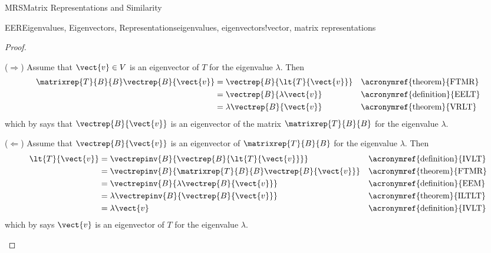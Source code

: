 \begin{subsect}{MRS}{Matrix Representations and Similarity}
\begin{theorem}{EER}{Eigenvalues, Eigenvectors, Representations}{eigenvalues, eigenvectors!vector, matrix representations}
\end{theorem}
%
\begin{proof}
\begin{para}($\Rightarrow$) Assume that $\vect{v}\in V$ is an eigenvector of $T$ for the eigenvalue $\lambda$.  Then
%
\begin{align*}
\matrixrep{T}{B}{B}\vectrep{B}{\vect{v}}
&=\vectrep{B}{\lt{T}{\vect{v}}}&&\text{\acronymref{theorem}{FTMR}}\\
&=\vectrep{B}{\lambda\vect{v}}&&\text{\acronymref{definition}{EELT}}\\
&=\lambda\vectrep{B}{\vect{v}}&&\text{\acronymref{theorem}{VRLT}}
\end{align*}
%
which by  says that $\vectrep{B}{\vect{v}}$ is an eigenvector of the matrix $\matrixrep{T}{B}{B}$ for the eigenvalue $\lambda$.\end{para}
%
\begin{para}($\Leftarrow$)  Assume that $\vectrep{B}{\vect{v}}$ is an eigenvector of $\matrixrep{T}{B}{B}$ for the eigenvalue $\lambda$.  Then
%
\begin{align*}
\lt{T}{\vect{v}}
&=\vectrepinv{B}{\vectrep{B}{\lt{T}{\vect{v}}}}&&\text{\acronymref{definition}{IVLT}}\\
&=\vectrepinv{B}{\matrixrep{T}{B}{B}\vectrep{B}{\vect{v}}}&&\text{\acronymref{theorem}{FTMR}}\\
&=\vectrepinv{B}{\lambda\vectrep{B}{\vect{v}}}&&\text{\acronymref{definition}{EEM}}\\
&=\lambda\vectrepinv{B}{\vectrep{B}{\vect{v}}}&&\text{\acronymref{theorem}{ILTLT}}\\
&=\lambda\vect{v}&&\text{\acronymref{definition}{IVLT}}
\end{align*}
%
which by  says $\vect{v}$ is an eigenvector of $T$ for the eigenvalue $\lambda$.\end{para}
%
\end{proof}
%
\end{subsect}
%
